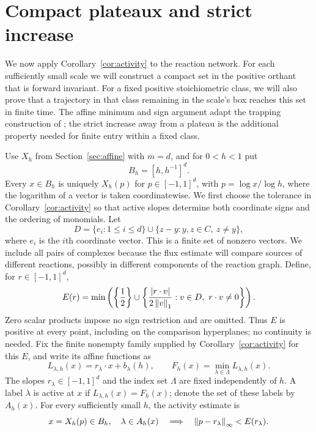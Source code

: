 \section{Compact plateaux and strict increase}\label{sec:trapping}

We now apply Corollary~\ref{cor:activity} to the reaction network.  For each
sufficiently small scale we will construct a compact set in the positive
orthant that is forward invariant.  For a fixed positive stoichiometric
class, we will also prove that a trajectory in that class remaining in
the scale's box reaches this set in finite time.  The affine
minimum and sign argument adapt the trapping construction of
\cite[Section~3]{OpenAI2026}; the strict increase away from a plateau is the
additional property needed for finite entry within a fixed class.

Use $X_h$ from Section~\ref{sec:affine} with $m=d$, and for $0<h<1$ put
\[
 B_h=[h,h^{-1}]^d.
\]
Every $x\in B_h$ is uniquely $X_h(p)$ for $p\in[-1,1]^d$, with
$p=\log x/\log h$, where the logarithm of a vector is taken coordinatewise.
We first choose the tolerance in Corollary~\ref{cor:activity} so that active
slopes determine both coordinate signs and the ordering of monomials.
Let
\begin{equation}\label{eq:comparison-directions}
 D=\{e_i:1\leq i\leq d\}
   \cup\{z-y:y,z\in C,\ z\ne y\},
\end{equation}
where $e_i$ is the $i$th coordinate vector.  This is a finite set of nonzero
vectors.  We include all pairs of complexes because the flux estimate
will compare sources of different reactions, possibly in different
components of the reaction graph.  Define, for $r\in[-1,1]^d$,
\begin{equation}\label{eq:network-tolerance}
 E(r)=\min\left(
 \left\{\frac12\right\}\cup
 \left\{\frac{\left|r\cdot v\right|}{2\left\|v\right\|_1}:
                 v\in D,\ r\cdot v\ne0\right\}\right).
\end{equation}
Zero scalar products impose no sign restriction and are omitted.
Thus $E$ is positive at every point, including on the comparison
hyperplanes; no continuity is needed.
Fix the finite nonempty family supplied by
Corollary~\ref{cor:activity} for this $E$, and write its affine functions as
\[
 L_{\lambda,h}(x)=r_\lambda\cdot x+b_\lambda(h),
 \qquad
 F_h(x)=\min_{\lambda\in\Lambda}L_{\lambda,h}(x).
\]
The slopes $r_\lambda\in[-1,1]^d$ and the index set $\Lambda$ are fixed
independently of $h$.  A label $\lambda$ is active at $x$ if
$L_{\lambda,h}(x)=F_h(x)$; denote the set of these labels by $A_h(x)$.
For every sufficiently small $h$, the activity estimate is
\begin{equation}\label{eq:network-activity}
 x=X_h(p)\in B_h,\quad \lambda\in A_h(x)
 \quad\Longrightarrow\quad
 \left\|p-r_\lambda\right\|_\infty<E(r_\lambda).
\end{equation}

